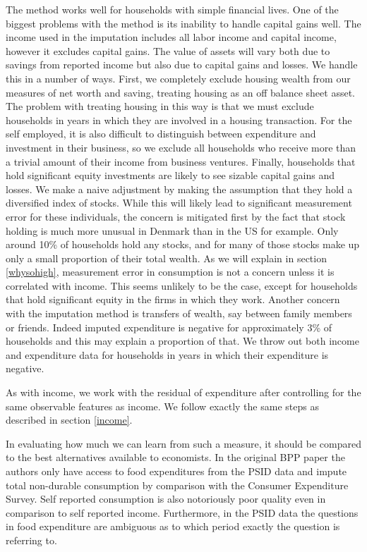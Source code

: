 \documentclass[titlepage]{\econtex}\newcommand{\texname}{IncomeUncertainty}
\begin{document}
The method works well for households with simple financial lives. One of the biggest problems with the method is its inability to handle capital gains well. The income used in the imputation includes all labor income and capital income, however it excludes capital gains. The value of assets will vary both due to savings from reported income but also due to capital gains and losses. We handle this in a number of ways. First, we completely exclude housing wealth from our measures of net worth and saving, treating housing as an off balance sheet asset. The problem with treating housing in this way is that we must exclude households in years in which they are involved in a housing transaction. For the self employed, it is also difficult to distinguish between expenditure and investment in their business, so we exclude all households who receive more than a trivial amount of their income from business ventures. Finally, households that hold significant equity investments are likely to see sizable capital gains and losses. We make a naive adjustment by making the assumption that they hold a diversified index of stocks. While this will likely lead to significant measurement error for these individuals, the concern is mitigated first by the fact that stock holding is much more unusual in Denmark than in the US for example. Only around 10\% of households hold any stocks, and for many of those stocks make up only a small proportion of their total wealth. As we will explain in section \ref{whysohigh}, measurement error in consumption is not a concern unless it is correlated with income. This seems unlikely to be the case, except for households that hold significant equity in the firms in which they work. Another concern with the imputation method is transfers of wealth, say between family members or friends. Indeed imputed expenditure is negative for approximately 3\% of households and this may explain a proportion of that. We throw out both income and expenditure data for households in years in which their expenditure is negative.

As with income, we work with the residual of expenditure after controlling for the same observable features as income. We follow exactly the same steps as described in section \ref{income}.

In evaluating how much we can learn from such a measure, it should be compared to the best alternatives available to economists. In the original BPP paper the authors only have access to food expenditures from the PSID data and impute total non-durable consumption by comparison with the Consumer Expenditure Survey. Self reported consumption is also notoriously poor quality even in comparison to self reported income. Furthermore, in the PSID data the questions in food expenditure are ambiguous as to which period exactly the question is referring to.
\end{document}

